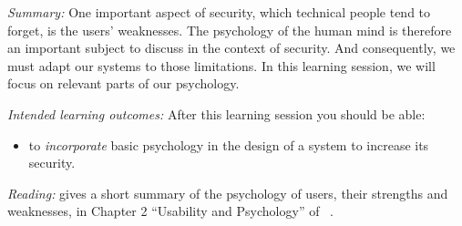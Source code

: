 \emph{Summary:}
One important aspect of security, which technical people tend to forget, is the 
users' weaknesses.
The psychology of the human mind is therefore an important subject to discuss 
in the context of security.
And consequently, we must adapt our systems to those limitations.
In this learning session, we will focus on relevant parts of our psychology.

\emph{Intended learning outcomes:}
After this learning session you should be able:
\begin{itemize}
  \item to \emph{incorporate} basic psychology in the design of a system to 
    increase its security.
\end{itemize}

\emph{Reading:}
 gives a short summary of the psychology of users, 
their strengths and weaknesses, in Chapter 2 \enquote{Usability and Psychology} 
of ~\cite{Anderson2008sea}.
